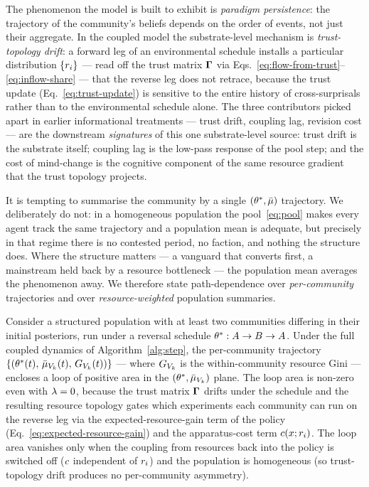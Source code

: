 The phenomenon the model is built to exhibit is \emph{paradigm
persistence}: the trajectory of the community's beliefs depends on the
order of events, not just their aggregate. In the coupled model the
substrate-level mechanism is \emph{trust-topology drift}: a forward
leg of an environmental schedule installs a particular distribution
$\{r_{i}\}$ --- read off the trust matrix $\boldsymbol{\Gamma}$ via
Eqs.~\eqref{eq:flow-from-trust}--\eqref{eq:inflow-share} --- that the
reverse leg does not retrace, because the trust update
(Eq.~\ref{eq:trust-update}) is sensitive to the entire history of
cross-surprisals rather than to the environmental schedule alone.
The three contributors picked apart in earlier informational
treatments --- trust drift, coupling lag, revision cost --- are the
downstream \emph{signatures} of this one substrate-level source: trust
drift is the substrate itself; coupling lag is the low-pass response
of the pool step; and the cost of mind-change is the cognitive
component of the same resource gradient that the trust topology
projects.

\begin{remark}
\label{rem:no-pool}
It is tempting to summarise the community by a single
$(\theta^{*},\bar{\mu})$ trajectory. We deliberately do not: in a
homogeneous population the pool~\eqref{eq:pool} makes every agent
track the same trajectory and a population mean is adequate, but
precisely in that regime there is no contested period, no faction,
and nothing the structure does. Where the structure matters --- a
vanguard that converts first, a mainstream held back by a resource
bottleneck --- the population mean averages the phenomenon away. We
therefore state path-dependence over \emph{per-community} trajectories
and over \emph{resource-weighted} population summaries.
\end{remark}

\begin{claim}
\label{claim:path-dependence}
Consider a structured population with at least two communities differing
in their initial posteriors, run under a reversal schedule
$\theta^{*}: A \to B \to A$. Under the full coupled dynamics of
Algorithm~\ref{alg:step}, the per-community trajectory
$\{(\theta^{*}(t),\, \bar{\mu}_{V_{k}}(t),\,
   G_{V_{k}}(t))\}$ ---
where $G_{V_{k}}$ is the within-community resource Gini ---
encloses a loop of positive area in the
$(\theta^{*}, \bar{\mu}_{V_{k}})$ plane. The loop area is
non-zero even with $\lambda = 0$, because the trust matrix $\boldsymbol{\Gamma}$
drifts under the schedule and the resulting resource topology gates
which experiments each community can run on the reverse leg via the
expected-resource-gain term of the policy
(Eq.~\ref{eq:expected-resource-gain}) and the apparatus-cost term
$c(x;r_{i})$. The loop area vanishes only when the
coupling from resources back into the policy is switched off
($c$ independent of $r_{i}$) and the population is
homogeneous (so trust-topology drift produces no per-community
asymmetry).
\end{claim}

